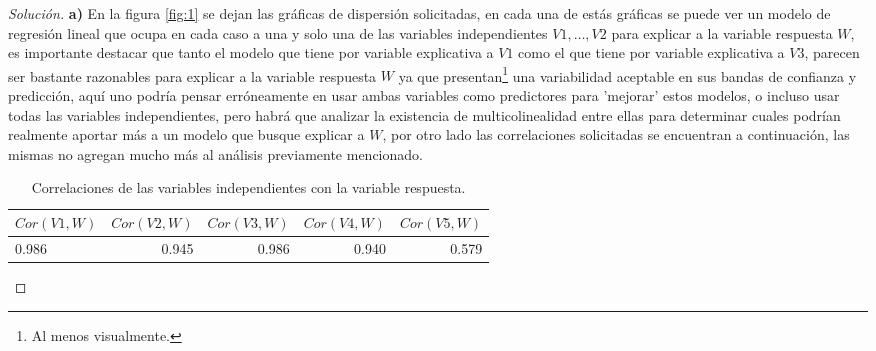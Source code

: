 \documentclass[10.5pt,notitlepage]{article}
\newenvironment{solucion}
  {\begin{proof}[Solución]}
  {\end{proof}}
\theoremstyle{plain}
\begin{document}
\begin{solucion}
\textbf{a)} En la figura \ref{fig:1} se dejan las gráficas de dispersión solicitadas, en cada una de estás gráficas se puede ver un modelo de regresión lineal que ocupa en cada caso a una y solo una de las variables independientes \(V1, \hdots, V2\) para explicar a la variable respuesta \(W\), es importante destacar que tanto el modelo que tiene por variable explicativa a \(V1\) como el que tiene por variable explicativa a \(V3\), parecen ser bastante razonables para explicar a la variable respuesta \(W\) ya que presentan\footnote{Al menos visualmente.} una variabilidad aceptable en sus bandas de confianza y predicción, aquí uno podría pensar erróneamente en usar ambas variables como predictores para 'mejorar' estos modelos, o incluso usar todas las variables independientes, pero habrá que analizar la existencia de multicolinealidad entre ellas para determinar cuales podrían realmente aportar más a un modelo que busque explicar a \(W\), por otro lado las correlaciones solicitadas se encuentran a continuación, las mismas no agregan mucho más al análisis previamente mencionado.
\begin{table}[H]
        \centering
        \begin{tabular}{@{}l@{\hskip 0.3in}r@{\hskip 0.3in}r@{\hskip 0.3in}r@{\hskip 0.3in}r@{}}
            \toprule
            \(Cor(V1,W)\)& \(Cor(V2,W)\) & \(Cor(V3,W)\)& \(Cor(V4,W)\)& \(Cor(V5,W)\) \\
            \midrule
               0.986 &0.945 &0.986& 0.940& 0.579 \\  
            \bottomrule
        \end{tabular}
        \caption{Correlaciones de las variables independientes con la variable respuesta.}
\end{table}


\end{solucion}
\end{document}
